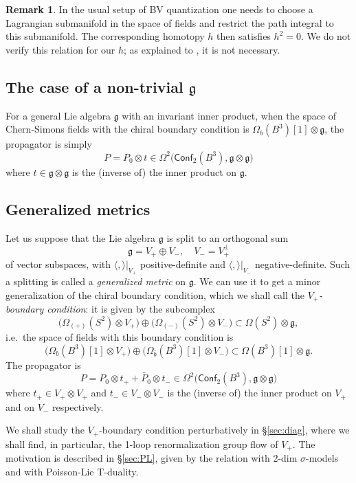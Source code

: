 \documentclass[a4paper]{amsart}
\theoremstyle{plain}
\theoremstyle{definition}
\newtheorem*{rem}{Remark}
\newcommand{\g}{\mathfrak{g}}
\newcommand{\la}{\langle}
\newcommand{\ra}{\rangle}
\newcommand{\cf}{\mathsf{Conf}}
\begin{document}
\begin{rem}
In the usual setup of BV quantization one needs to choose a Lagrangian submanifold in the space of fields and restrict the path integral to this submanifold. The corresponding homotopy $h$ then satisfies $h^2=0$. We do not verify this relation for our $h$; as explained to \cite{CM}, it is not necessary.
\end{rem}

\subsection{The case of a non-trivial $\g$}
For a general Lie algebra $\g$ with an invariant inner product, when the space of Chern-Simons fields with the chiral boundary condition is $\Omega_b(B^3)[1]\otimes\g$, the propagator is simply
$$P=P_0\otimes t\in \Omega^2\bigl(\cf_2(B^3),\g\otimes\g\bigr)$$
where $t\in\g\otimes\g$ is the (inverse of) the inner product on $\g$. 
\subsection{Generalized metrics}\label{sec:gm}
Let us suppose that the Lie algebra $\g$ is split to an orthogonal sum
$$\g=V_+\oplus V_-,\quad V_-=V_+^\perp$$
of vector subspaces, with $\la,\ra|_{V_+}$ positive-definite and $\la,\ra|_{V_-}$ negative-definite. Such a splitting is called a \emph{generalized metric} on $\g$. We can use it to get  a minor generalization of the chiral boundary condition, which we shall call the \emph{$V_+$-boundary condition}: it is given by the subcomplex
$$\bigl(\Omega_{(+)}(S^2)\otimes V_+\bigr) \oplus \bigl(\Omega_{(-)}(S^2)\otimes V_-\bigr) \subset\Omega(S^2)\otimes\g,$$
i.e.\ the  space of fields with this boundary condition is
$$\bigl(\Omega_{b}(B^3)[1]\otimes V_+\bigr) \oplus \bigl(\Omega_{\bar b}(B^3)[1]\otimes V_-\bigr)\subset \Omega(B^3)[1]\otimes\g.
$$
The propagator is
\begin{equation}\label{gmprop}
P=P_0\otimes t_+ + \bar P_0\otimes t_-\in \Omega^2\bigl(\cf_2(B^3),\g\otimes\g\bigr)
\end{equation}
where $t_+\in V_+\otimes V_+$ and $t_-\in V_-\otimes V_-$ is the (inverse of) the inner product on $V_+$ and on $V_-$ respectively.

We shall study the $V_+$-boundary condition perturbatively in \S\ref{sec:diag}, where we shall find, in particular, the 1-loop renormalization group flow of $V_+$. The motivation is described in \S\ref{sec:PL}, given by the relation with 2-dim $\sigma$-models and with Poisson-Lie T-duality.
\end{document}
